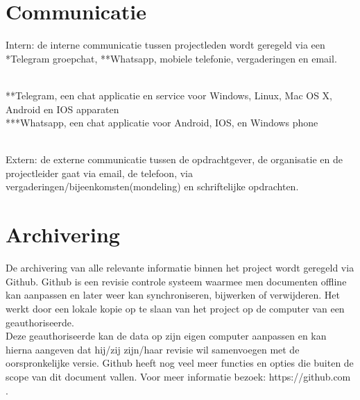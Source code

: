 \documentclass[oneside]{book}
\begin{document}
\section*{Communicatie}
Intern: de interne communicatie tussen projectleden wordt geregeld via een *Telegram groepchat,
**Whatsapp, mobiele telefonie, vergaderingen en email.\\
\\
\begin{small}
**Telegram, een chat applicatie en service voor Windows, Linux, Mac OS X, Android en IOS apparaten\\
***Whatsapp, een chat applicatie voor Android, IOS, en Windows phone\\
\end{small}
\\
Extern: de externe communicatie tussen de opdrachtgever, de organisatie en de projectleider gaat via email,
de telefoon, via vergaderingen/bijeenkomsten(mondeling) en schriftelijke opdrachten.

\section*{Archivering}
De archivering van alle relevante informatie binnen het project wordt geregeld via Github.
Github is een revisie controle systeem waarmee men documenten offline kan aanpassen en
later weer kan synchroniseren, bijwerken of verwijderen.
Het werkt door een lokale kopie op te slaan van het project op de computer van een
geauthoriseerde.\\
Deze geauthoriseerde kan de data op zijn eigen computer aanpassen en kan hierna aangeven dat
hij/zij zijn/haar revisie wil samenvoegen met de oorspronkelijke versie.
Github heeft nog veel meer functies en opties die buiten de scope van dit document vallen.
Voor meer informatie bezoek: https://github.com .
\end{document}
